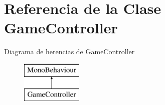 \hypertarget{class_game_controller}{}\section{Referencia de la Clase Game\+Controller}
\label{class_game_controller}
Diagrama de herencias de Game\+Controller\begin{figure}[H]
\begin{center}
\leavevmode
\includegraphics[height=2.000000cm]{class_game_controller}
\end{center}
\end{figure}
